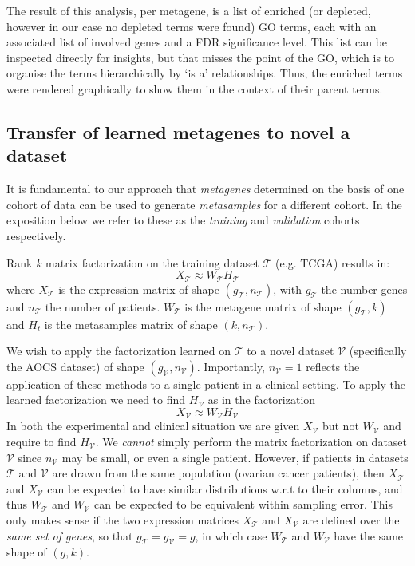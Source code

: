 \documentclass[draft, tikz, 12pt,a4paper,oneside,fleqn]{article}
\begin{document}
The result of this analysis, per metagene, is a list of enriched (or depleted, however in our case no depleted terms were found) GO terms, each with an associated list of involved genes and a FDR significance level.   This list can be inspected directly for insights, but that misses the point of the GO, which is to organise the terms hierarchically by `is a' relationships.   Thus, the enriched terms were rendered graphically to show them in the context of their parent terms.   


\subsection{Transfer of learned metagenes to novel a dataset}
\label{sec-transfer-to-novel}

\newcommand{\trainset}{\mathcal{T}}
\newcommand{\validset}{\mathcal{V}}

It is fundamental to our approach that \emph{metagenes} determined on the basis of one cohort of data can be used to generate \emph{metasamples} for a different cohort.  In the exposition below we refer to these as the \emph{training} and \emph{validation} cohorts respectively.

Rank $k$ matrix factorization on the training dataset $\trainset$ (e.g. TCGA) results in:
\begin{equation}
 X_\trainset \approx W_\trainset H_\trainset
\end{equation}
where $X_\trainset$ is the expression matrix of shape $(g_\trainset, n_\trainset)$, with $g_\trainset$ the number genes and $n_\trainset$ the number of patients. $W_\trainset$ is the metagene matrix of shape $(g_\trainset, k)$ and $H_t$ is the metasamples matrix of shape $(k, n_\trainset)$.

We wish to apply the factorization learned on $\trainset$ to a novel dataset $\validset$ (specifically the AOCS dataset) of shape $(g_\validset, n_\validset)$. 
Importantly, $n_\validset = 1$ reflects the application of these methods to a single patient in a clinical setting.  To apply the learned factorization we need to find $H_\validset$ as in the factorization
\begin{equation}
	X_\validset \approx W_\validset H_\validset
\end{equation}
In both the experimental and clinical situation we are given $X_\validset$ but not $W_\validset$ and require to find $H_\validset$. 
We \emph{cannot} simply perform the matrix factorization on dataset $\validset$ since $n_\validset$ may be small, or even a single patient.   
However, if patients in datasets $\trainset$ and $\validset$ are drawn from the same population (ovarian cancer patients), then $X_\trainset$ and $X_\validset$ can be expected to have similar distributions w.r.t to their columns, and thus $W_\trainset$ and $W_\validset$ can be expected to be equivalent within sampling error.  
This only makes sense if the two expression matrices $X_\trainset$ and $X_\validset$ are defined over the \emph{same set of genes}, so that $g_\trainset = g_\validset = g$, in which case $W_\trainset$ and $W_\validset$ have the same shape of $(g, k)$.   
\end{document}
